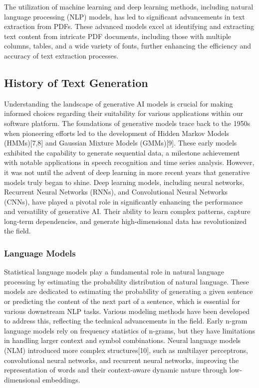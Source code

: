 \documentclass[conference]{IEEEtran}
\begin{document}
The utilization of machine learning and deep learning methods, including natural language processing (NLP) models, has led to significant advancements in text extraction from PDFs. These advanced models excel at identifying and extracting text content from intricate PDF documents, including those with multiple columns, tables, and a wide variety of fonts, further enhancing the efficiency and accuracy of text extraction processes.

\subsection{History of Text Generation}

Understanding the landscape of generative AI models is crucial for making informed choices regarding their suitability for various applications within our software platform. The foundations of generative models trace back to the 1950s when pioneering efforts led to the development of Hidden Markov Models (HMMs)[7,8] and Gaussian Mixture Models (GMMs)[9]. These early models exhibited the capability to generate sequential data, a milestone achievement with notable applications in speech recognition and time series analysis. However, it was not until the advent of deep learning in more recent years that generative models truly began to shine. Deep learning models, including neural networks, Recurrent Neural Networks (RNNs), and Convolutional Neural Networks (CNNs), have played a pivotal role in significantly enhancing the performance and versatility of generative AI. Their ability to learn complex patterns, capture long-term dependencies, and generate high-dimensional data has revolutionized the field.

\subsubsection{Language Models}

Statistical language models play a fundamental role in natural language processing by estimating the probability distribution of natural language. These models are dedicated to estimating the probability of generating a given sentence or predicting the content of the next part of a sentence, which is essential for various downstream NLP tasks. Various modeling methods have been developed to address this, reflecting the technical advancements in the field. Early n-gram language models rely on frequency statistics of n-grams, but they have limitations in handling larger context and symbol combinations. Neural language models (NLM) introduced more complex structures[10], such as multilayer perceptrons, convolutional neural networks, and recurrent neural networks, improving the representation of words and their context-aware dynamic nature through low-dimensional embeddings.
\end{document}
